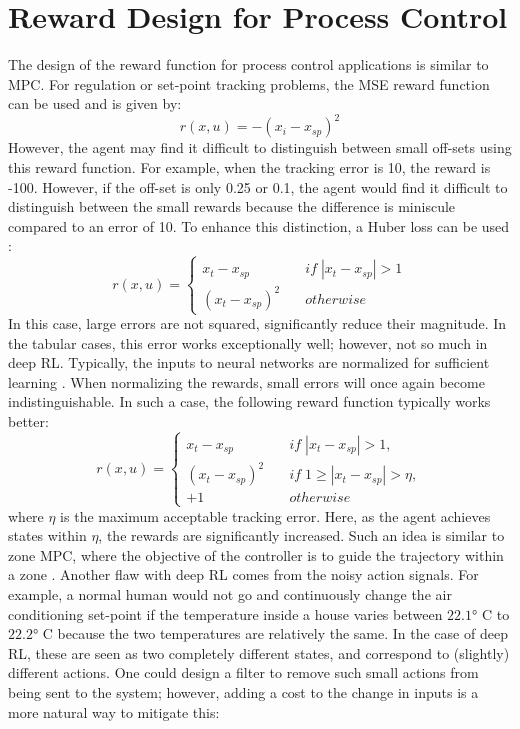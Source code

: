 \section{Reward Design for Process Control}
The design of the reward function for process control applications is similar to MPC.  For regulation or set-point tracking problems, the MSE reward function can be used and is given by:
\begin{equation}
    r(x, u) = -(x_i - x_{sp})^2
\end{equation}
However, the agent may find it difficult to distinguish between small off-sets using this reward function.  For example, when the tracking error is 10, the reward is -100.  However, if the off-set is only 0.25 or 0.1, the agent would find it difficult to distinguish between the small rewards because the difference is miniscule compared to an error of 10.  To enhance this distinction, a Huber loss can be used \cite{huber}:
\begin{equation*}
    r(x, u) = \begin{cases}
    x_t - x_{sp} & \quad if \; |x_t - x_{sp}| > 1 \\
    (x_t - x_{sp})^2 & \quad otherwise
    \end{cases}
\end{equation*}
In this case, large errors are not squared, significantly reduce their magnitude.  In the tabular cases, this error works exceptionally well; however, not so much in deep RL.  Typically, the inputs to neural networks are normalized for sufficient learning \cite{NN}.  When normalizing the rewards, small errors will once again become indistinguishable.  In such a case, the following reward function typically works better:
\begin{equation*}
    r(x, u) = \begin{cases}
    x_t - x_{sp} & \quad if \; |x_t - x_{sp}| > 1, \\
    (x_t - x_{sp})^2 & \quad if \; 1 \geq |x_t - x_{sp}| > \eta, \\
    +1 & \quad otherwise
    \end{cases}
\end{equation*}
where $\eta$ is the maximum acceptable tracking error. Here, as the agent achieves states within $\eta$, the rewards are significantly increased.  Such an idea is similar to zone MPC, where the objective of the controller is to guide the trajectory within a zone \cite{zone_mpc}. Another flaw with deep RL comes from the noisy action signals.  For example, a normal human would not go and continuously change the air conditioning set-point if the temperature inside a house varies between $\ang{22.1}$ C to $\ang{22.2}$ C because the two temperatures are relatively the same.  In the case of deep RL, these are seen as two completely different states, and correspond to (slightly) different actions.  One could design a filter to remove such small actions from being sent to the system; however, adding a cost to the change in inputs is a more natural way to mitigate this:
